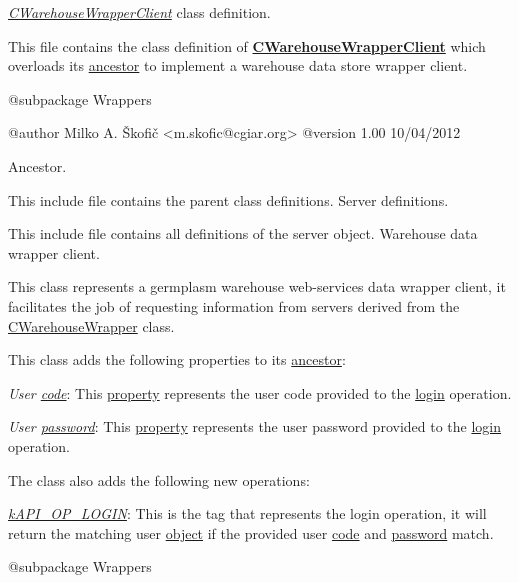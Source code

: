 {\itshape \hyperlink{class_c_warehouse_wrapper_client}{C\-Warehouse\-Wrapper\-Client}} class definition.

This file contains the class definition of {\bfseries \hyperlink{class_c_warehouse_wrapper_client}{C\-Warehouse\-Wrapper\-Client}} which overloads its \hyperlink{class_c_mongo_data_wrapper_client}{ancestor} to implement a warehouse data store wrapper client.

\begin{DoxyVerb}    @subpackage     Wrappers

    @author         Milko A. Škofič <m.skofic@cgiar.org>
    @version        1.00 10/04/2012\end{DoxyVerb}


Ancestor.

This include file contains the parent class definitions. Server definitions.

This include file contains all definitions of the server object. Warehouse data wrapper client.

This class represents a germplasm warehouse web-\/services data wrapper client, it facilitates the job of requesting information from servers derived from the \hyperlink{class_c_warehouse_wrapper}{C\-Warehouse\-Wrapper} class.

This class adds the following properties to its \hyperlink{class_c_wrapper_client}{ancestor}\-:


\begin{DoxyItemize}
\item {\itshape User \hyperlink{}{code}}\-: This \hyperlink{}{property} represents the user code provided to the \hyperlink{}{login} operation. 
\item {\itshape User \hyperlink{}{password}}\-: This \hyperlink{}{property} represents the user password provided to the \hyperlink{}{login} operation. 
\end{DoxyItemize}

The class also adds the following new operations\-:


\begin{DoxyItemize}
\item {\itshape \hyperlink{}{k\-A\-P\-I\-\_\-\-O\-P\-\_\-\-L\-O\-G\-I\-N}}\-: This is the tag that represents the login operation, it will return the matching user \hyperlink{class_c_user}{object} if the provided user \hyperlink{}{code} and \hyperlink{}{password} match. 
\end{DoxyItemize}

\begin{DoxyVerb}    @subpackage     Wrappers\end{DoxyVerb}


